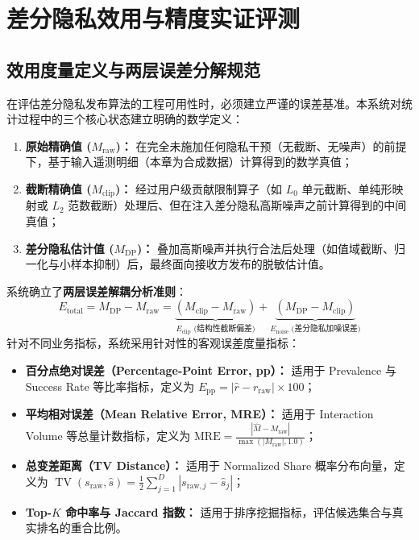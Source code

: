 \section{差分隐私效用与精度实证评测}
\label{sec:utility}

\subsection{效用度量定义与两层误差分解规范}
在评估差分隐私发布算法的工程可用性时，必须建立严谨的误差基准。本系统对统计过程中的三个核心状态建立明确的数学定义：
\begin{enumerate}[label=(\alph*), leftmargin=2.5em]
  \item \textbf{原始精确值 ($M_{\text{raw}}$)：} 在完全未施加任何隐私干预（无截断、无噪声）的前提下，基于输入遥测明细（本章为合成数据）计算得到的数学真值；
  \item \textbf{截断精确值 ($M_{\text{clip}}$)：} 经过用户级贡献限制算子（如 $L_0$ 单元截断、单纯形映射或 $L_2$ 范数截断）处理后、但在注入差分隐私高斯噪声之前计算得到的中间真值；
  \item \textbf{差分隐私估计值 ($M_{\text{DP}}$)：} 叠加高斯噪声并执行合法后处理（如值域截断、归一化与小样本抑制）后，最终面向接收方发布的脱敏估计值。
\end{enumerate}

系统确立了\textbf{两层误差解耦分析准则}：
\begin{equation}
  \label{eq:two_tier_decomp}
  E_{\text{total}} = M_{\text{DP}} - M_{\text{raw}} = \underbrace{(M_{\text{clip}} - M_{\text{raw}})}_{E_{\text{clip}}\text{ (结构性截断偏差)}} + \underbrace{(M_{\text{DP}} - M_{\text{clip}})}_{E_{\text{noise}}\text{ (差分隐私加噪误差)}}
\end{equation}
针对不同业务指标，系统采用针对性的客观误差度量指标：
\begin{itemize}[leftmargin=2em]
  \item \textbf{百分点绝对误差（Percentage-Point Error, pp）：} 适用于 Prevalence 与 Success Rate 等比率指标，定义为 $E_{\text{pp}} = |\hat{r} - r_{\text{raw}}| \times 100$；
  \item \textbf{平均相对误差（Mean Relative Error, MRE）：} 适用于 Interaction Volume 等总量计数指标，定义为 $\text{MRE} = \frac{|\hat{M} - M_{\text{raw}}|}{\max(|M_{\text{raw}}|, 1.0)}$；
  \item \textbf{总变差距离（TV Distance）：} 适用于 Normalized Share 概率分布向量，定义为 $\operatorname{TV}(s_{\text{raw}}, \hat{s}) = \frac{1}{2} \sum_{j=1}^D |s_{\text{raw}, j} - \hat{s}_j|$；
  \item \textbf{Top-$K$ 命中率与 Jaccard 指数：} 适用于排序挖掘指标，评估候选集合与真实排名的重合比例。
\end{itemize}

